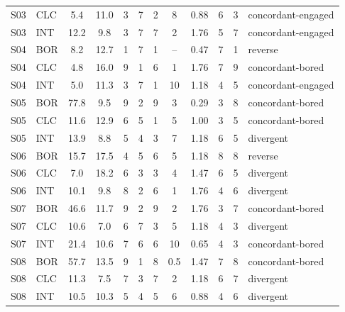 \begin{tabular}{llcccccccccl}
S03 & CLC & 5.4 & 11.0 & 3 & 7 & 2 & 8 & 0.88 & 6 & 3 & concordant-engaged \\
S03 & INT & 12.2 & 9.8 & 3 & 7 & 7 & 2 & 1.76 & 5 & 7 & concordant-engaged \\
S04 & BOR & 8.2 & 12.7 & 1 & 7 & 1 & -- & 0.47 & 7 & 1 & reverse \\
S04 & CLC & 4.8 & 16.0 & 9 & 1 & 6 & 1 & 1.76 & 7 & 9 & concordant-bored \\
S04 & INT & 5.0 & 11.3 & 3 & 7 & 1 & 10 & 1.18 & 4 & 5 & concordant-engaged \\
S05 & BOR & 77.8 & 9.5 & 9 & 2 & 9 & 3 & 0.29 & 3 & 8 & concordant-bored \\
S05 & CLC & 11.6 & 12.9 & 6 & 5 & 1 & 5 & 1.00 & 3 & 5 & concordant-bored \\
S05 & INT & 13.9 & 8.8 & 5 & 4 & 3 & 7 & 1.18 & 6 & 5 & divergent \\
S06 & BOR & 15.7 & 17.5 & 4 & 5 & 6 & 5 & 1.18 & 8 & 8 & reverse \\
S06 & CLC & 7.0 & 18.2 & 6 & 3 & 3 & 4 & 1.47 & 6 & 5 & divergent \\
S06 & INT & 10.1 & 9.8 & 8 & 2 & 6 & 1 & 1.76 & 4 & 6 & divergent \\
S07 & BOR & 46.6 & 11.7 & 9 & 2 & 9 & 2 & 1.76 & 3 & 7 & concordant-bored \\
S07 & CLC & 10.6 & 7.0 & 6 & 7 & 3 & 5 & 1.18 & 4 & 3 & divergent \\
S07 & INT & 21.4 & 10.6 & 7 & 6 & 6 & 10 & 0.65 & 4 & 3 & concordant-bored \\
S08 & BOR & 57.7 & 13.5 & 9 & 1 & 8 & 0.5 & 1.47 & 7 & 8 & concordant-bored \\
S08 & CLC & 11.3 & 7.5 & 7 & 3 & 7 & 2 & 1.18 & 6 & 7 & divergent \\
S08 & INT & 10.5 & 10.3 & 5 & 4 & 5 & 6 & 0.88 & 4 & 6 & divergent \\
\hline
\end{tabular}

